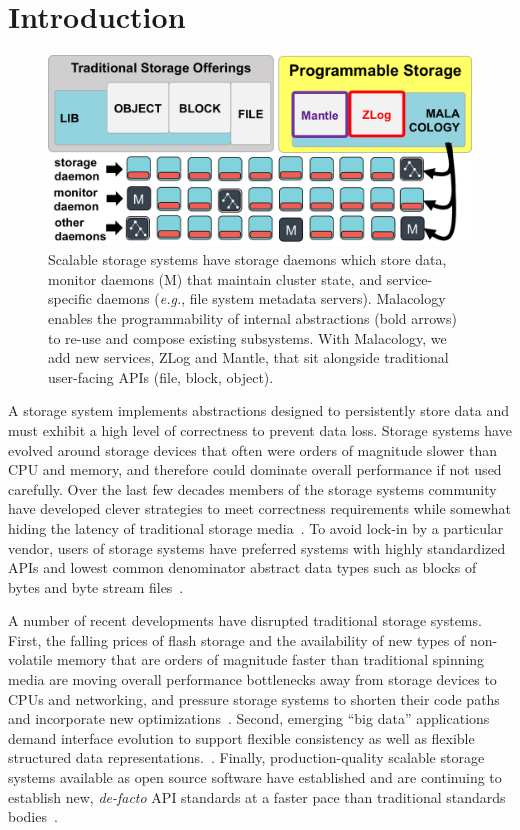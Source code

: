 \section{Introduction}
\label{introduction}
\label{sec:intro}

\begin{figure}[tb]
\centering
\includegraphics{figures/overview.png}
\caption{Scalable storage systems have storage daemons which store data,
monitor daemons (M) that maintain cluster state, and service-specific daemons
({\it e.g.}, file system metadata servers). Malacology enables the programmability of
internal abstractions (bold arrows) to re-use and compose
existing subsystems.  With Malacology, we add new services, ZLog and
Mantle, that sit alongside traditional user-facing APIs (file, block,
object).}\label{fig:overview}
\end{figure}

A storage system implements abstractions designed to persistently store data
and must exhibit a high level of correctness to prevent data loss.  Storage
systems have evolved around storage devices that often were orders of magnitude
slower than CPU and memory, and therefore could dominate overall performance if
not used carefully. Over the last few decades members of the storage systems
community have developed clever strategies to meet correctness requirements
while somewhat hiding the latency of traditional storage
media~\cite{brewer_disks_2016}. To avoid lock-in by a particular vendor, users
of storage systems have preferred systems with highly standardized APIs and
lowest common denominator abstract data types such as blocks of bytes and byte
stream files~\cite{armbrust_view_2010}.

A number of recent developments have disrupted traditional storage systems.
First, the falling prices of flash storage and the availability of new types of
non-volatile memory that are orders of magnitude faster than traditional
spinning media are moving overall performance bottlenecks away from storage
devices to CPUs and networking, and pressure storage systems to shorten their
code paths and incorporate new
optimizations~\cite{gray_tape_2007,gray_flash_2008}.  Second, emerging ``big
data'' applications demand interface evolution to support flexible consistency
as well as flexible structured data
representations.~\cite{apache_contributors_parquet_2014}.  Finally,
production-quality scalable storage systems available as open source software
have established and are continuing to establish new, \emph{de-facto} API
standards at a faster pace than traditional standards
bodies~\cite{snia_implementing_2014,linux_foundation_kinetic_2015}.

